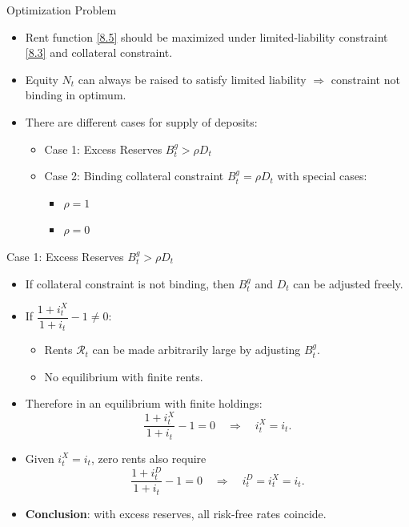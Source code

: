 \documentclass[11pt,aspectratio=169]{beamer}
\begin{document}
\begin{frame}{Optimization Problem}
  \begin{itemize}
  \item Rent function \eqref{8.5} should be maximized under limited-liability constraint \eqref{8.3} and collateral constraint. 
\vspace{1em}
  \item Equity $N_t$ can always be raised to satisfy limited liability $\Rightarrow$ constraint not binding in optimum.
  \vspace{1em}
  \item There are different cases for supply of deposits: 
  \begin{itemize}
      \item Case 1: Excess Reserves $B_t^g > \rho D_t$
      \item Case 2: Binding collateral constraint $B_t^g = \rho D_t$ with special cases: 
      \begin{itemize}
          \item $\rho = 1$
          \item $\rho = 0$
      \end{itemize}
  \end{itemize}
  \end{itemize}
\end{frame}

\begin{frame}{Case 1: Excess Reserves $B_t^g > \rho D_t$}
\small
  \begin{itemize}
    \item If collateral constraint is not binding, then $B_t^g$ and $D_t$ can be adjusted freely.
    \item If $\dfrac{1+i_t^X}{1+i_t} - 1 \neq 0$:
    \begin{itemize}
      \item Rents $\mathcal{R}_t$ can be made arbitrarily large by adjusting $B_t^g$.
      \item No equilibrium with finite rents.
    \end{itemize}
    \item Therefore in an equilibrium with finite holdings:
    $$\frac{1+i_t^X}{1+i_t} - 1 = 0
      \quad\Rightarrow\quad
      i_t^X = i_t.$$
    \item Given $i_t^X = i_t$, zero rents also require
$$\frac{1+i_t^D}{1+i_t} - 1 = 0
      \quad\Rightarrow\quad
      i_t^D = i_t^X = i_t.$$
    \item \textbf{Conclusion}: with excess reserves, all risk-free rates coincide.
  \end{itemize}
\end{frame}
\end{document}
